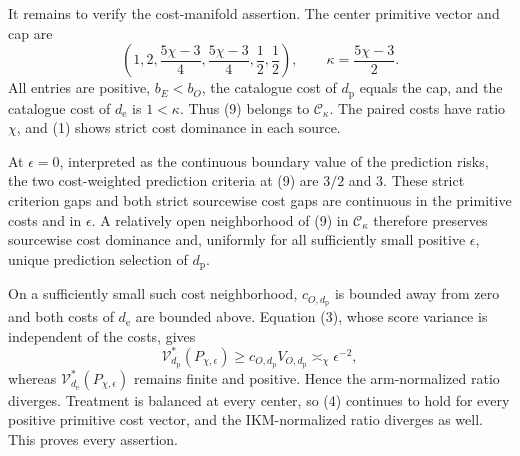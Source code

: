 It remains to verify the cost-manifold assertion. The center primitive vector and cap are
\[
 \left(1,2,\frac{5\chi-3}{4},\frac{5\chi-3}{4},
 \frac12,\frac12\right),
 \qquad \kappa=\frac{5\chi-3}{2}.                     \tag{9}
\]
All entries are positive, \(b_E<b_O\), the catalogue cost of \(d_{\mathrm p}\) equals the cap, and the catalogue cost of \(d_{\mathrm e}\) is \(1<\kappa\). Thus (9) belongs to \(\mathcal C_\kappa\). The paired costs have ratio \(\chi\), and (1) shows strict cost dominance in each source.

At \(\epsilon=0\), interpreted as the continuous boundary value of the prediction risks, the two cost-weighted prediction criteria at (9) are \(3/2\) and \(3\). These strict criterion gaps and both strict sourcewise cost gaps are continuous in the primitive costs and in \(\epsilon\). A relatively open neighborhood of (9) in \(\mathcal C_\kappa\) therefore preserves sourcewise cost dominance and, uniformly for all sufficiently small positive \(\epsilon\), unique prediction selection of \(d_{\mathrm p}\).

On a sufficiently small such cost neighborhood, \(c_{O,d_{\mathrm p}}\) is bounded away from zero and both costs of \(d_{\mathrm e}\) are bounded above. Equation (3), whose score variance is independent of the costs, gives
\[
 \mathcal V_{d_{\mathrm p}}^*(P_{\chi,\epsilon})
 \ge c_{O,d_{\mathrm p}}V_{O,d_{\mathrm p}}
 \asymp_\chi\epsilon^{-2},                            \tag{10}
\]
whereas \(\mathcal V_{d_{\mathrm e}}^*(P_{\chi,\epsilon})\) remains finite and positive. Hence the arm-normalized ratio diverges. Treatment is balanced at every center, so (4) continues to hold for every positive primitive cost vector, and the IKM-normalized ratio diverges as well. This proves every assertion.